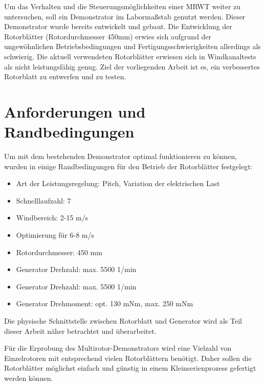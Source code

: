 Um das Verhalten und die Steuerungsmöglichkeiten einer MRWT weiter zu untersuchen, soll ein Demonstrator im Labormaßstab genutzt werden. Dieser Demonstrator wurde bereits entwickelt und gebaut. Die Entwicklung der Rotorblätter (Rotordurchmesser 450mm) erwies sich aufgrund der ungewöhnlichen Betriebsbedingungen und Fertigungsschwierigkeiten allerdings als schwierig. Die aktuell verwendeten Rotorblätter erwiesen sich in Windkanaltests als nicht leistungsfähig genug. Ziel der vorliegenden Arbeit ist es, ein verbessertes Rotorblatt zu entwerfen und zu testen.
\section{Anforderungen und Randbedingungen}
Um mit dem bestehenden Demonstrator optimal funktionieren zu können, wurden in \cite{buchholz_erarbeitung_2020} einige Randbedingungen für den Betrieb der Rotorblätter festgelegt:
\begin{itemize}
    \item Art der Leistungsregelung: Pitch, Variation der elektrischen Last
    \item Schnelllaufzahl: 7
    \item Windbereich: 2-15 m/s
    \item Optimierung für 6-8 m/s
    \item Rotordurchmesser: 450 mm
    \item Generator Drehzahl: max. 5500 1/min
    \item Generator Drehzahl: max. 5500 1/min
    \item Generator Drehmoment: opt. 130 mNm, max. 250 mNm
\end{itemize}

Die physische Schnittstelle zwischen Rotorblatt und Generator wird als Teil dieser Arbeit näher betrachtet und überarbeitet.

Für die Erprobung des Multirotor-Demonstrators wird eine Vielzahl von Einzelrotoren mit entsprechend vielen Rotorblättern benötigt. Daher sollen die Rotorblätter möglichst einfach und günstig in einem Kleinserienprozess gefertigt werden können.

